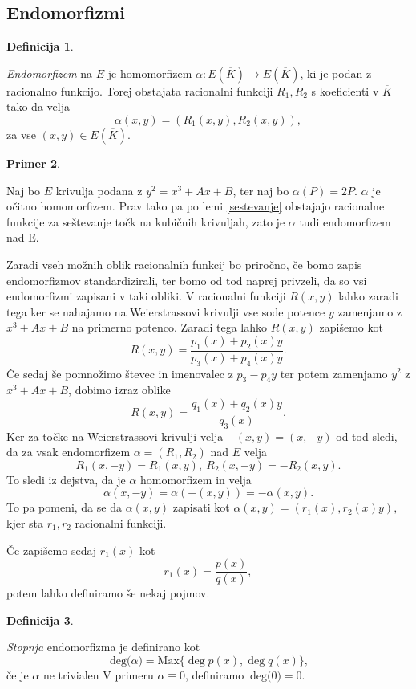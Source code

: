 \documentclass[12pt,a4paper,twoside]{article}
\theoremstyle{definition} %
\newtheorem{definicija}{Definicija}[section]
\newtheorem{primer}[definicija]{Primer}
\theoremstyle{plain} %
\numberwithin{equation}{section}  %
\newcommand{\E}[1]{E({#1})}
\newcommand{\DEG}[1]{\ \text{deg(}{#1}\text{)}}
\begin{document}
\subsection{Endomorfizmi}

\begin{definicija}~

\emph{Endomorfizem} na $E$ je homomorfizem $\alpha: \E{\overline{K}} \rightarrow \E{\overline{K}} $, ki je podan z racionalno funkcijo. Torej obstajata racionalni funkciji $R_1,R_2$ s koeficienti v $\overline{K}$ tako da velja
$$\alpha(x,y) = (R_1(x,y),R_2(x,y)),$$
za vse $(x,y) \in \E{\overline{K}}$.
\end{definicija}

\begin{primer}~

Naj bo $E$ krivulja podana z $y^2 = x^3+Ax+B$, ter naj bo $\alpha(P) = 2P$. $\alpha$ je očitno homomorfizem. Prav tako pa po lemi \ref{sestevanje} obstajajo racionalne funkcije za seštevanje točk na kubičnih krivuljah, zato je $\alpha$ tudi endomorfizem nad E.
\end{primer}

Zaradi vseh možnih oblik racionalnih funkcij bo priročno, če bomo zapis endomorfizmov standardizirali, ter bomo od tod naprej privzeli, da so vsi endomorfizmi zapisani v taki obliki.
V racionalni funkciji $R(x,y)$ lahko zaradi tega ker se nahajamo na Weierstrassovi krivulji vse sode potence $y$ zamenjamo z $x^3+Ax+B$ na primerno potenco. Zaradi tega lahko $R(x,y)$ zapišemo kot
$$R(x,y) = \frac{p_1(x)+p_2(x)y}{p_3(x)+p_4(x)y}.$$
Če sedaj še pomnožimo števec in imenovalec z $p_3-p_4y$ ter potem zamenjamo $y^2$ z $x^3+Ax+B$, dobimo izraz oblike
$$R(x,y) = \frac{q_1(x)+q_2(x)y}{q_3(x)}.$$
Ker za točke na Weierstrassovi krivulji velja $-(x,y) = (x,-y)$ od tod sledi, da za vsak endomorfizem $\alpha = (R_1,R_2) $ nad $E$ velja
$$R_1(x,-y) = R_1(x,y), \ R_2(x,-y) = -R_2(x,y).$$
To sledi iz dejstva, da je $\alpha$ homomorfizem in velja
$$\alpha(x,-y) = \alpha(-(x,y)) = -\alpha(x,y).$$
To pa pomeni, da se da $\alpha(x,y)$ zapisati kot
$\alpha(x,y) = (r_1(x),r_2(x)y),$
kjer sta $r_1,r_2$ racionalni funkciji.

Če zapišemo sedaj $r_1(x)$ kot
$$r_1(x) = \frac{p(x)}{q(x)},$$
potem lahko definiramo še nekaj pojmov. 

\begin{definicija}~

\emph{Stopnja} endomorfizma je  definirano kot
$$\DEG{\alpha} = \text{Max} \{ \deg{p(x)},\deg{q(x)} \},$$
če je $\alpha$ ne trivialen V primeru $\alpha \equiv 0$, definiramo $\DEG{0} = 0$.
\end{definicija}
\end{document}
